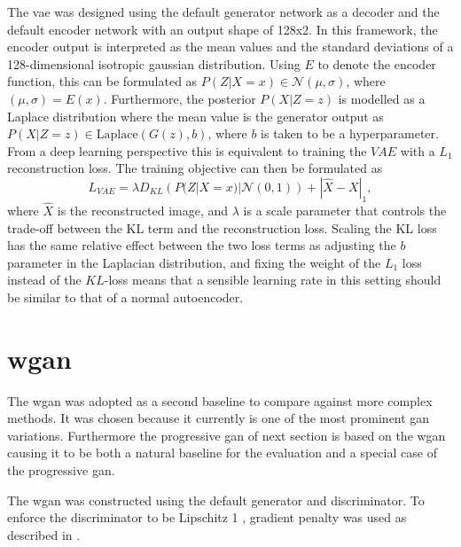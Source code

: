 The \acrlong{vae} was designed using the default generator network as a decoder and the default encoder network with an output shape of 128x2. In this framework, the encoder output is interpreted as the mean values and the standard deviations of a 128-dimensional isotropic gaussian distribution. Using $E$ to denote the encoder function, this can be formulated as $P(Z|X=x) \in \mathcal{N}(\mu, \sigma)$, where $(\mu, \sigma) = E(x)$. Furthermore, the posterior $P(X|Z=z)$ is modelled as a Laplace distribution where the mean value is the generator output as $P(X|Z=z) \in \text{Laplace}(G(z), b)$, where $b$ is taken to be a hyperparameter. From a deep learning perspective this is equivalent to training the $VAE$ with a $L_1$ reconstruction loss. The training objective can then be formulated as 
\begin{equation}
    L_{VAE} = \lambda D_{KL}\left(P(Z|X=x) | \mathcal{N}(0,1)\right) + |\hat{X} - X|_1,
\end{equation}
where $\hat{X}$ is the reconstructed image, and $\lambda$ is a scale parameter that controls the trade-off between the KL term and the reconstruction loss. Scaling the KL loss has the same relative effect between the two loss terms as adjusting the $b$ parameter in the Laplacian distribution, and fixing the weight of the $L_1$ loss instead of the $KL$-loss means  that a sensible learning rate in this setting should be similar to that of a normal autoencoder. 

\section{\acrlong{wgan}}
The \acrfull{wgan} was adopted as a second baseline to compare against more complex methods. It was chosen because it currently is one of the most prominent \acrshort{gan} variations. Furthermore the progressive \acrshort{gan} of next section is based on the \acrshort{wgan} causing it to be both a natural baseline for the evaluation and a special case of the progressive \acrshort{gan}. 

The \acrshort{wgan} was constructed using the default generator and discriminator. To enforce the discriminator to be Lipschitz 1 , gradient penalty was used as described in \parencite{gulrajani2017improved}.

